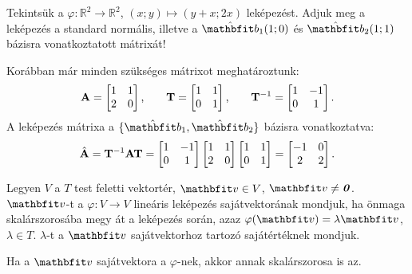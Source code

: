 \documentclass{szb-practice}
\begin{document}
\begin{example}
  Tekintsük a $\varphi: \mathbb R^2 \rightarrow \mathbb R^2$,
  $(x; y) \mapsto (y + x; 2x)$ leképezést. Adjuk meg a leképezés a standard
  normális, illetve a $\hat{\rvec b}_1(1; 0)$ és $\hat{\rvec b}_2(1; 1)$ bázisra
  vonatkoztatott mátrixát!

  Korábban már minden szükséges mátrixot meghatároztunk:
  $$
    \mathbf{A} = \begin{bmatrix}
      1 & 1 \\
      2 & 0
    \end{bmatrix}
    \text,\qquad
    \mathbf{T} = \begin{bmatrix}
      1 & 1 \\
      0 & 1
    \end{bmatrix}
    \text,\qquad
    \mathbf{T}^{-1} = \begin{bmatrix}
      1 & -1 \\
      0 & 1
    \end{bmatrix}
    \text.
  $$
  A leképezés mátrixa a $\{\hat{\rvec b}_1, \hat{\rvec b}_2\}$ bázisra
  vonatkoztatva:
  $$
    \hat{\mathbf{A}} = \mathbf{T}^{-1} \mathbf{A} \mathbf{T} = \begin{bmatrix}
      1 & -1 \\
      0 & 1
    \end{bmatrix} \begin{bmatrix}
      1 & 1 \\
      2 & 0
    \end{bmatrix} \begin{bmatrix}
      1 & 1 \\
      0 & 1
    \end{bmatrix} = \begin{bmatrix}
      -1 & 0 \\
      2  & 2
    \end{bmatrix}
    \text.
  $$
\end{example}

\begin{definition}
  Legyen $V$ a $T$ test feletti vektortér, $\rvec v \in V$, $\rvec v \neq
    \nvec$. $\rvec v$-t a $\varphi: V \rightarrow V$ lineáris leképezés
  sajátvektorának mondjuk, ha önmaga skalárszorosába megy át a leképezés
  során, azaz $\varphi(\rvec v) = \lambda \rvec v$,  $\lambda \in T$.
  $\lambda$-t a $\rvec v$ sajátvektorhoz tartozó sajátértéknek mondjuk.
\end{definition}

\begin{note}
  Ha a $\rvec v$ sajátvektora a $\varphi$-nek, akkor annak skalárszorosa is az.
\end{note}
\end{document}
